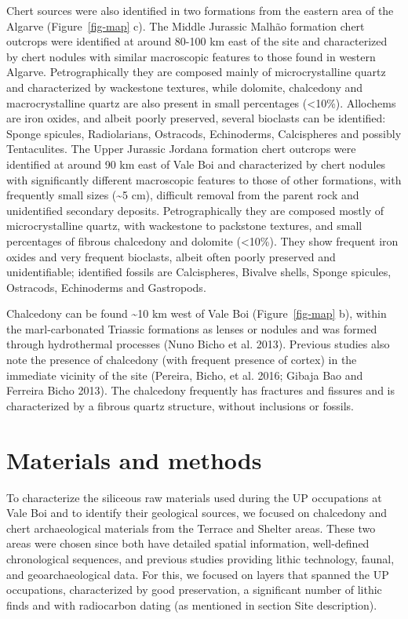 \documentclass[
  a4paper,
  DIV=11,
  numbers=noendperiod]{scrreprt}
\begin{document}
Chert sources were also identified in two formations from the eastern
area of the Algarve (Figure~\ref{fig-map} c). The Middle Jurassic Malhão
formation chert outcrops were identified at around 80-100 km east of the
site and characterized by chert nodules with similar macroscopic
features to those found in western Algarve. Petrographically they are
composed mainly of microcrystalline quartz and characterized by
wackestone textures, while dolomite, chalcedony and macrocrystalline
quartz are also present in small percentages (\textless10\%). Allochems
are iron oxides, and albeit poorly preserved, several bioclasts can be
identified: Sponge spicules, Radiolarians, Ostracods, Echinoderms,
Calcispheres and possibly Tentaculites. The Upper Jurassic Jordana
formation chert outcrops were identified at around 90 km east of Vale
Boi and characterized by chert nodules with significantly different
macroscopic features to those of other formations, with frequently small
sizes (\textasciitilde5 cm), difficult removal from the parent rock and
unidentified secondary deposits. Petrographically they are composed
mostly of microcrystalline quartz, with wackestone to packstone
textures, and small percentages of fibrous chalcedony and dolomite
(\textless10\%). They show frequent iron oxides and very frequent
bioclasts, albeit often poorly preserved and unidentifiable; identified
fossils are Calcispheres, Bivalve shells, Sponge spicules, Ostracods,
Echinoderms and Gastropods.

Chalcedony can be found \textasciitilde10 km west of Vale Boi
(Figure~\ref{fig-map} b), within the marl-carbonated Triassic formations
as lenses or nodules and was formed through hydrothermal processes (Nuno
Bicho et al. 2013). Previous studies also note the presence of
chalcedony (with frequent presence of cortex) in the immediate vicinity
of the site (Pereira, Bicho, et al. 2016; Gibaja Bao and Ferreira Bicho
2013). The chalcedony frequently has fractures and fissures and is
characterized by a fibrous quartz structure, without inclusions or
fossils.

\section{Materials and methods}\label{materials-and-methods}

To characterize the siliceous raw materials used during the UP
occupations at Vale Boi and to identify their geological sources, we
focused on chalcedony and chert archaeological materials from the
Terrace and Shelter areas. These two areas were chosen since both have
detailed spatial information, well-defined chronological sequences, and
previous studies providing lithic technology, faunal, and
geoarchaeological data. For this, we focused on layers that spanned the
UP occupations, characterized by good preservation, a significant number
of lithic finds and with radiocarbon dating (as mentioned in section
Site description).
\end{document}
